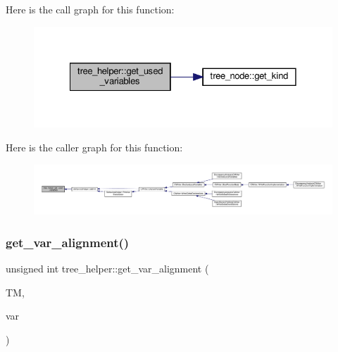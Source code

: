 Here is the call graph for this function\+:
\nopagebreak
\begin{figure}[H]
\begin{center}
\leavevmode
\includegraphics[width=328pt]{d7/d99/classtree__helper_a268bdfc7f6a52b970efc1715f557d55a_cgraph}
\end{center}
\end{figure}
Here is the caller graph for this function\+:
\nopagebreak
\begin{figure}[H]
\begin{center}
\leavevmode
\includegraphics[width=350pt]{d7/d99/classtree__helper_a268bdfc7f6a52b970efc1715f557d55a_icgraph}
\end{center}
\end{figure}
\mbox{\label{classtree__helper_a112bb01a10176c6cb052bde46ea1c369}} 
\subsubsection{\texorpdfstring{get\+\_\+var\+\_\+alignment()}{get\_var\_alignment()}}
{\footnotesize\ttfamily unsigned int tree\+\_\+helper\+::get\+\_\+var\+\_\+alignment (\begin{DoxyParamCaption}\item[{const \hyperlink{tree__manager_8hpp_a792e3f1f892d7d997a8d8a4a12e39346}{tree\+\_\+manager\+Const\+Ref} \&}]{TM,  }\item[{unsigned int}]{var }\end{DoxyParamCaption})\hspace{0.3cm}{\ttfamily [static]}}




